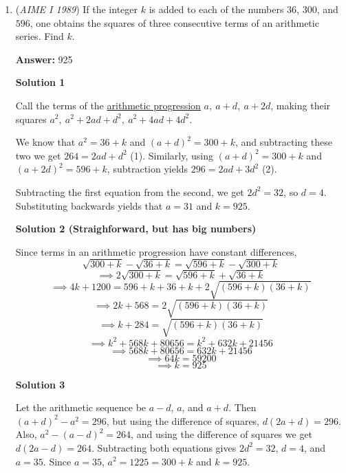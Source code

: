 \begin{enumerate}
 Drop the altitude from $M$ to $AB$, and call it $P$. $\triangle AMP$ is a $30-60-90$ triangle, so $AP = 4t$ and $MP = 4\sqrt{3}t$, and by the Pythagorean theorem on $\triangle MPB$, $PB = t$. $AP + BP = AB$, so $t=20$. Therefore, $8t = \boxed{160}$.

 


	\item (\textit{AIME I 1989}) If the integer $k$ is added to each of the numbers $36$, $300$, and $596$, one obtains the squares of three consecutive terms of an arithmetic series. Find $k$.


 
 \textbf{Answer: }925



\textbf{Solution 1}

Call the terms of the \href{https://artofproblemsolving.com/wiki/index.php?title=Arithmetic\_progression}{arithmetic progression} $a,\ a + d,\ a + 2d$, making their squares $a^2,\ a^2 + 2ad + d^2,\ a^2 + 4ad + 4d^2$.

 We know that $a^2 = 36 + k$ and $(a + d)^2 = 300 + k$, and subtracting these two we get $264 = 2ad + d^2$ (1). Similarly, using $(a + d)^2 = 300 + k$ and $(a + 2d)^2 = 596 + k$, subtraction yields $296 = 2ad + 3d^2$ (2). 

 Subtracting the first equation from the second, we get $2d^2 = 32$, so $d = 4$. Substituting backwards yields that $a = 31$ and $k = \boxed{925}$.

 



\textbf{Solution 2 (Straighforward, but has big numbers)}

Since terms in an arithmetic progression have constant differences, 
 \[\sqrt{300+k}-\sqrt{36+k}=\sqrt{596+k}-\sqrt{300+k}\]
 \[\implies 2\sqrt{300+k} = \sqrt{596+k}+\sqrt{36+k}\]
 \[\implies 4k+1200=596+k+36+k+2\sqrt{(596+k)(36+k)}\]
 \[\implies 2k+568=2\sqrt{(596+k)(36+k)}\]
 \[\implies k+284=\sqrt{(596+k)(36+k)}\]
 \[\implies k^2+568k+80656=k^2+632k+21456\]
 \[\implies 568k+80656=632k+21456\]
 \[\implies 64k = 59200\]
 \[\implies k = \boxed{925}\]




\textbf{Solution 3}

Let the arithmetic sequence be $a-d$, $a$, and $a+d$. Then $(a+d)^2-a^2 = 296$, but using the difference of squares, $d(2a+d)=296$. Also, $a^2-(a-d)^2 = 264$, and using the difference of squares we get $d(2a-d) = 264$. Subtracting both equations gives $2d^2 = 32$, $d = 4$, and $a = 35$. Since $a = 35$, $a^2 = 1225 = 300+k$ and $k = \boxed{925}$.


\end{enumerate}

